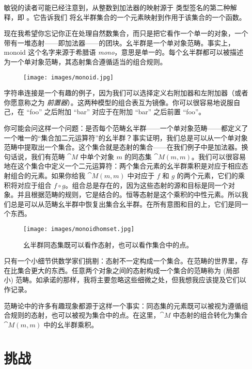 敏锐的读者可能已经注意到，从整数到加法器的映射源于  类型签名的第二种解释，即 。它告诉我们  将幺半群集合的一个元素映射到作用于该集合的一个函数。

现在我希望你忘记你正在处理自然数集合，而只是把它看作一个单一的对象，一个带有一堆态射——即加法器——的团块。幺半群是一个单对象范畴。事实上，monoid 这个名字来源于希腊语 \emph{mono}，意思是单一的。每个幺半群都可以被描述为一个单对象范畴，其态射集合遵循适当的组合规则。

\begin{figure}[H]
  \centering
  \texttt{[image: images/monoid.jpg]}
\end{figure}

\noindent
字符串连接是一个有趣的例子，因为我们可以选择定义右附加器和左附加器（或者你愿意称之为 \emph{前置器}）。这两种模型的组合表互为镜像。你可以很容易地说服自己，在 “foo” 之后附加 “bar” 对应于在附加 “bar” 之后前置 “foo”。

你可能会问这样一个问题：是否每个范畴幺半群——一个单对象范畴——都定义了一个唯一的“集合加二元运算符”的幺半群？事实证明，我们总是可以从一个单对象范畴中提取出一个集合。这个集合就是态射的集合——在我们例子中是加法器。换句话说，我们有范畴 $\cat{M}$ 中单个对象 $m$ 的同态集 $\cat{M}(m, m)$。我们可以很容易地在这个集合中定义一个二元运算符：两个集合元素的幺半群乘积是对应于相应态射组合的元素。如果你给我 $\cat{M}(m, m)$ 中对应于 $f$ 和 $g$ 的两个元素，它们的乘积将对应于组合 $f \circ g$。组合总是存在的，因为这些态射的源和目标是同一个对象。并且根据范畴的规则，它是结合的。恒等态射是这个乘积的中性元素。所以我们总是可以从范畴幺半群中恢复出集合幺半群。在所有意图和目的上，它们是同一个东西。

\begin{figure}[H]
  \centering
  \texttt{[image: images/monoidhomset.jpg]}
  \caption{幺半群同态集既可以看作态射，也可以看作集合中的点。}
\end{figure}

\noindent
只有一个小细节供数学家们挑剔：态射不一定构成一个集合。在范畴的世界里，存在比集合更大的东西。任意两个对象之间的态射构成一个集合的范畴称为  (局部小) 范畴。如承诺的那样，我将主要忽略这些细微之处，但我想我应该提及它们以作记录。

范畴论中的许多有趣现象都源于这样一个事实：同态集的元素既可以被视为遵循组合规则的态射，也可以被视为集合中的点。在这里，$\cat{M}$ 中态射的组合转化为集合 $\cat{M}(m, m)$ 中的幺半群乘积。

\section{挑战}

